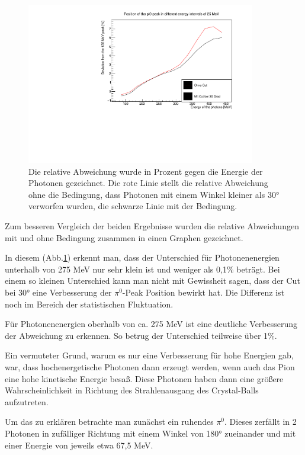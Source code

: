 \documentclass[a4paper,11pt,oneside,final,german,openbib,pdftex]{scrbook}
\begin{document}
{\begin{figure}[h!]
	\begin{center}
		\includegraphics[width=100mm]{20172803SymmetricUnchargedDeviationCut}
		\caption{Die relative Abweichung wurde in Prozent gegen die Energie der Photonen gezeichnet. Die rote Linie stellt die relative Abweichung ohne die Bedingung, dass Photonen mit einem Winkel kleiner als 30° verworfen wurden, die schwarze Linie mit der Bedingung.}
		\label{fig:Vernachlaessigung-Detektoren-am-Rand}
	\end{center}
\end{figure}

Zum besseren Vergleich der beiden Ergebnisse wurden die relative Abweichungen mit und ohne Bedingung zusammen in einen Graphen gezeichnet. 

In diesem (Abb.\ref{fig:Vernachlaessigung-Detektoren-am-Rand}) erkennt man, dass der Unterschied f\"ur Photonenenergien unterhalb von 275 MeV nur sehr klein ist und weniger als 0,1\% betr\"agt. Bei einem so kleinen Unterschied kann man nicht mit Gewissheit sagen, dass der Cut bei 30° eine Verbesserung der $\pi^0$-Peak Position bewirkt hat. Die Differenz ist noch im Bereich der statistischen Fluktuation. 

F\"ur Photonenenergien oberhalb von ca. 275 MeV ist eine deutliche Verbesserung der Abweichung zu erkennen. So betrug der Unterschied teilweise über 1\%.

Ein vermuteter Grund, warum es nur eine Verbesserung für hohe Energien gab, war, dass hochenergetische Photonen dann erzeugt werden, wenn auch das Pion eine hohe kinetische Energie besa{\ss}. Diese Photonen haben dann eine gr\"o{\ss}ere Wahrscheinlichkeit in Richtung des Strahlenausgang des Crystal-Balls aufzutreten.

Um das zu erkl\"aren betrachte man zun\"achst ein ruhendes $\pi^0$. Dieses zerf\"allt in 2 Photonen in zuf\"alliger Richtung mit einem Winkel von 180° zueinander und mit einer Energie von jeweils etwa 67,5 MeV. 

}
\end{document}
